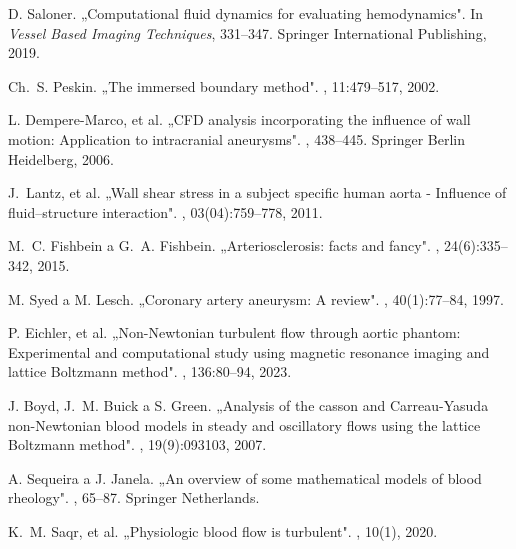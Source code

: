 \begin{thebibliography}{10}
	
	D. Saloner.
	\newblock „{C}omputational fluid dynamics for evaluating hemodynamics".
	\newblock In {\em Vessel Based Imaging Techniques}, 331--347. Springer
	International Publishing, 2019.
	
	Ch.~S. Peskin.
	\newblock „{T}he immersed boundary method".
	, 11:479--517, 2002.
	
	L. Dempere-Marco, et al.
	\newblock „{CFD} analysis incorporating the influence of wall motion:
	Application to intracranial aneurysms".
	, 438--445. Springer Berlin Heidelberg,
	2006.
	
	J.~Lantz, et al.
	\newblock „{W}all shear stress in a subject specific human aorta - Influence of fluid--structure interaction".
	, 03(04):759--778,
	2011.
	
	M.~C. Fishbein a G.~A. Fishbein.
	\newblock „{A}rteriosclerosis: facts and fancy".
	, 24(6):335--342, 2015.
	
	M. Syed a M. Lesch.
	\newblock „{C}oronary artery aneurysm: A review".
	, 40(1):77--84, 1997.
	
	P. Eichler, et al.
	\newblock „{N}on-Newtonian turbulent flow through aortic phantom: Experimental and
	computational study using magnetic resonance imaging and lattice Boltzmann
	method".
	, 136:80--94,
	2023.
	
	J. Boyd, J.~M. Buick a S. Green.
	\newblock „{A}nalysis of the casson and {C}arreau-{Y}asuda non-Newtonian blood models
	in steady and oscillatory flows using the lattice {B}oltzmann method".
	, 19(9):093103, 2007.
	
	A. Sequeira a J. Janela.
	\newblock „{A}n overview of some mathematical models of blood rheology".
	, 65--87. Springer Netherlands.
	
	K.~M. Saqr, et al.
	\newblock „{P}hysiologic blood flow is turbulent".
	, 10(1), 2020.
	

\end{thebibliography}
